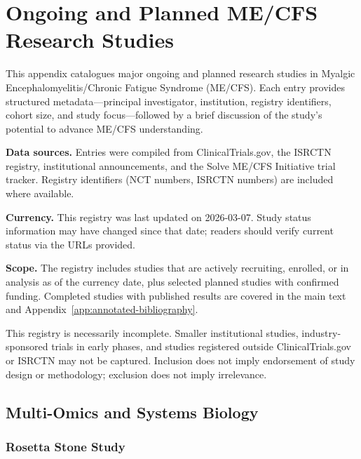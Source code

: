 \chapter{Ongoing and Planned ME/CFS Research Studies}
\label{app:research-registry}

This appendix catalogues major ongoing and planned research studies in Myalgic
Encephalomyelitis/Chronic Fatigue Syndrome (ME/CFS).  Each entry provides
structured metadata---principal investigator, institution, registry
identifiers, cohort size, and study focus---followed by a brief discussion of
the study's potential to advance ME/CFS understanding.

\textbf{Data sources.}  Entries were compiled from ClinicalTrials.gov, the
ISRCTN registry, institutional announcements, and the Solve ME/CFS Initiative
trial tracker.  Registry identifiers (NCT numbers, ISRCTN numbers) are
included where available.

\textbf{Currency.}  This registry was last updated on 2026-03-07.
Study status information may have changed since that date; readers should
verify current status via the URLs provided.

\textbf{Scope.}  The registry includes studies that are actively recruiting,
enrolled, or in analysis as of the currency date, plus selected planned studies
with confirmed funding.  Completed studies with published results are covered
in the main text and Appendix~\ref{app:annotated-bibliography}.

\begin{limitation}
This registry is necessarily incomplete.  Smaller institutional studies,
industry-sponsored trials in early phases, and studies registered outside
ClinicalTrials.gov or ISRCTN may not be captured.  Inclusion does not imply
endorsement of study design or methodology; exclusion does not imply
irrelevance.
\end{limitation}

\section{Multi-Omics and Systems Biology}
\label{sec:registry-multiomics}

\subsection{Rosetta Stone Study}
\label{sec:registry-rosetta-stone}

